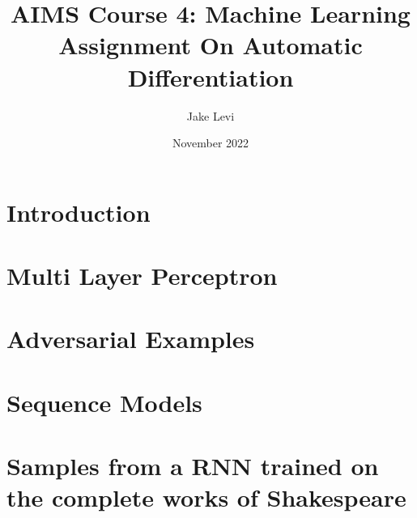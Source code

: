 \documentclass{article}
\title{
    AIMS Course 4: Machine Learning \\
    \large Assignment On Automatic Differentiation
}
\author{Jake Levi}
\date{November 2022}
\begin{document}
\maketitle
\section{Introduction} \label{section:intro}

\section{Multi Layer Perceptron}

\section{Adversarial Examples}

\section{Sequence Models}



\appendix
\section{Samples from a RNN trained on the complete works of Shakespeare}\label{appendix:rnn samples}


\end{document}
